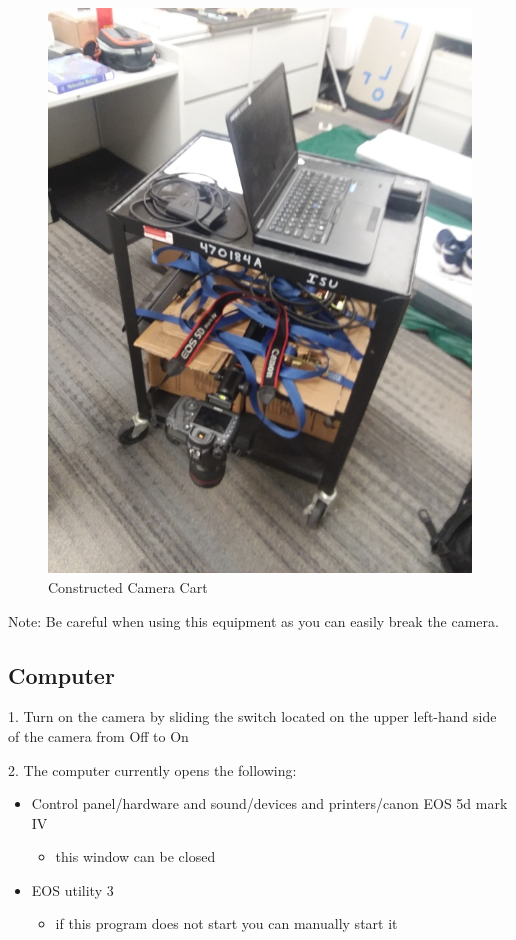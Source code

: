 \begin{figure}[!htp]
\centering
\includegraphics[scale=.2]{Cart2.png}
\caption{Constructed Camera Cart}
\label{Image 11}
\end{figure}

Note: Be careful when using this equipment as you can easily break the camera. 


\subsection{Computer}

1. Turn on the camera by sliding the switch located on the upper left-hand side of the camera from Off to On

2. The computer currently opens the following:
\begin{itemize}
\item Control panel/hardware and sound/devices and printers/canon EOS 5d mark IV
\begin{itemize}
\item this window can be closed
\end{itemize}
\item EOS utility 3
\begin{itemize}
\item if this program does not start you can manually start it
\end{itemize}
\end{itemize}



